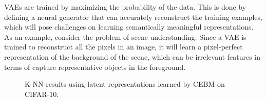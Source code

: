 \documentclass[tablecaption=bottom,wcp]{jmlr} %
\begin{document}


VAEs are trained by maximizing the probability of the data. This is done by defining a neural generator that can accurately reconstruct the training examples, which will pose challenges on learning semantically meaningful representations. As an example, consider the problem of scene understanding. Since a VAE is trained to reconstruct all the pixels in an image, it will learn a pixel-perfect representation of the background of the scene, which can be irrelevant features in terms of capture representative objects in the foreground. 

\begin{figure}[!t]
\label{fig:cebm-knn-cifar10}
\centering
{}%
\caption{K-NN results using latent representations learned by CEBM on CIFAR-10.}
\end{figure}
\end{document}
